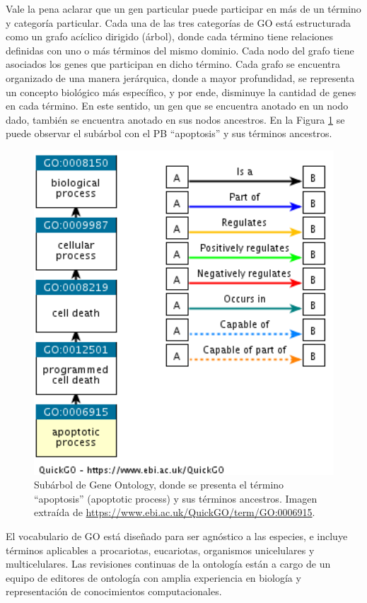 \documentclass[12pt,twoside]{reedthesis}
\begin{document}
Vale la pena aclarar que un gen particular puede participar en más de un término y categoría particular. Cada una de las tres categorías de GO está estructurada como un grafo acíclico dirigido (árbol), donde cada término tiene relaciones definidas con uno o más términos del mismo dominio. Cada nodo del grafo tiene asociados los genes que participan en dicho término. Cada grafo se encuentra organizado de una manera jerárquica, donde a mayor profundidad, se representa un concepto biológico más específico, y por ende, disminuye la cantidad de genes en cada término. En este sentido, un gen que se encuentra anotado en un nodo dado, también se encuentra anotado en sus nodos ancestros. En la Figura \ref{fig:goApopttree} se puede observar el subárbol con el PB ``apoptosis'' y sus términos ancestros.
\begin{figure}

{\centering \includegraphics[width=4.42in]{images/go_apoptosis_tree} 

}

\caption{Subárbol de Gene Ontology, donde se presenta el término ``apoptosis'' (apoptotic process) y sus términos ancestros. Imagen extraída de \url{https://www.ebi.ac.uk/QuickGO/term/GO:0006915}.}\label{fig:goApopttree}
\end{figure}


El vocabulario de GO está diseñado para ser agnóstico a las especies, e incluye términos aplicables a procariotas, eucariotas, organismos unicelulares y multicelulares. Las revisiones continuas de la ontología están a cargo de un equipo de editores de ontología con amplia experiencia en biología y representación de conocimientos computacionales.
\end{document}
